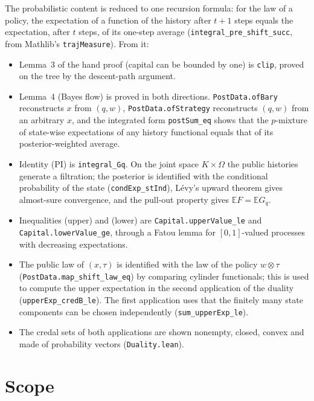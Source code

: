 \documentclass[11pt]{article}
\theoremstyle{definition}
\begin{document}
The probabilistic content is reduced to one recursion formula: for the law of a policy, the expectation of a function of the history after $t+1$ steps equals the expectation, after $t$ steps, of its one-step average (\texttt{integral\_pre\_shift\_succ}, from Mathlib's \texttt{trajMeasure}). From it:
\begin{itemize}
\item Lemma~3 of the hand proof (capital can be bounded by one) is \texttt{clip}, proved on the tree by the descent-path argument.
\item Lemma~4 (Bayes flow) is proved in both directions. \texttt{PostData.ofBary} reconstructs $x$ from $(q,w)$, \texttt{PostData.ofStrategy} reconstructs $(q,w)$ from an arbitrary $x$, and the integrated form \texttt{postSum\_eq} shows that the $p$-mixture of state-wise expectations of any history functional equals that of its posterior-weighted average.
\item Identity (PI) is \texttt{integral\_Gq}. On the joint space $K\times\Omega$ the public histories generate a filtration; the posterior is identified with the conditional probability of the state (\texttt{condExp\_stInd}), Lévy's upward theorem gives almost-sure convergence, and the pull-out property gives $\mathbb E F=\mathbb E G_q$.
\item Inequalities (upper) and (lower) are \texttt{Capital.upperValue\_le} and \texttt{Capital.lowerValue\_ge}, through a Fatou lemma for $[0,1]$-valued processes with decreasing expectations.
\item The public law of $(x,\tau)$ is identified with the law of the policy $w\otimes\tau$ (\texttt{PostData.map\_shift\_law\_eq}) by comparing cylinder functionals; this is used to compute the upper expectation in the second application of the duality (\texttt{upperExp\_credB\_le}). The first application uses that the finitely many state components can be chosen independently (\texttt{sum\_upperExp\_le}).
\item The credal sets of both applications are shown nonempty, closed, convex and made of probability vectors (\texttt{Duality.lean}).
\end{itemize}

\section{Scope}
\end{document}
